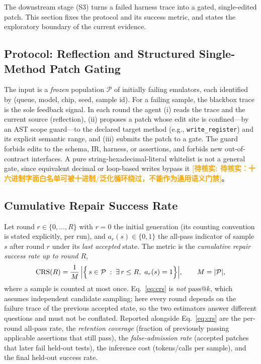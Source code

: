 \documentclass[preprint,review]{elsarticle}
\theoremstyle{definition}
\newcommand{\unverified}[1]{\textcolor{orange}{\textbf{[待核实: #1]}}}
\begin{document}
The downstream stage (S3) turns a failed harness trace into a gated, single-edited patch.
This section fixes the protocol and its success metric, and states the exploratory boundary
of the current evidence.

\subsection{Protocol: Reflection and Structured Single-Method Patch Gating}
\label{sec:repair-protocol}

The input is a \emph{frozen} population $\mathcal{P}$ of initially failing emulators, each
identified by (queue, model, chip, seed, sample id). For a failing sample, the blackbox trace
is the sole feedback signal. In each round the agent (i) reads the trace and the current
source (reflection), (ii) proposes a patch whose edit site is confined---by an AST scope
guard---to the declared target method (e.g., \texttt{write\_register}) and its explicit
semantic range, and (iii) submits the patch to a gate. The guard forbids edits to the schema,
IR, harness, or assertions, and forbids new out-of-contract interfaces. A pure
string-hexadecimal-literal whitelist is not a general gate, since equivalent decimal or
loop-based writes bypass it \unverified{待核实：十六进制字面白名单可被十进制/泛化循环绕过，不能作为通用语义门禁}。

\subsection{Cumulative Repair Success Rate}
\label{sec:crs}

Let round $r\in\{0,\dots,R\}$ with $r=0$ the initial generation (its counting convention is
stated explicitly, per run), and $a_r(s)\in\{0,1\}$ the all-pass indicator of sample $s$
after round $r$ under its \emph{last accepted} state. The metric is the \emph{cumulative
repair success rate up to round $R$},
\begin{equation}
\mathrm{CRS}(R) = \frac{1}{M}\,\Bigl|\Bigl\{\,s\in\mathcal{P}\;:\;\exists\, r\le R,\ a_r(s)=1\Bigr\}\Bigr|,\qquad M=|\mathcal{P}|,
\label{eq:crs}
\end{equation}
where a sample is counted at most once. Eq.~\eqref{eq:crs} is \emph{not} $\mathrm{pass@}k$,
which assumes independent candidate sampling; here every round depends on the failure trace
of the previous accepted state, so the two estimators answer different questions and must not
be conflated. Reported alongside Eq.~\eqref{eq:crs} are the per-round all-pass rate, the
\emph{retention coverage} (fraction of previously passing applicable assertions that still
pass), the \emph{false-admission rate} (accepted patches that later fail held-out tests), the
inference cost (tokens/calls per sample), and the final held-out success rate.
\end{document}
